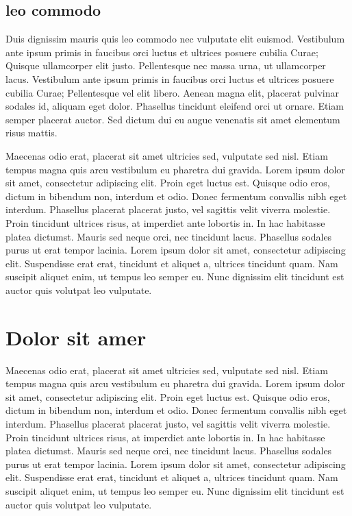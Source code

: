 \documentclass[twoside,emptyfirstpagenumber,swedish]{../thesis}
\begin{document}
\subsection{leo commodo}

Duis dignissim mauris quis leo commodo nec vulputate elit euismod. Vestibulum ante ipsum primis in faucibus orci luctus et ultrices posuere cubilia Curae; Quisque ullamcorper elit justo. Pellentesque nec massa urna, ut ullamcorper lacus. Vestibulum ante ipsum primis in faucibus orci luctus et ultrices posuere cubilia Curae; Pellentesque vel elit libero. Aenean magna elit, placerat pulvinar sodales id, aliquam eget dolor. Phasellus tincidunt eleifend orci ut ornare. Etiam semper placerat auctor. Sed dictum dui eu augue venenatis sit amet elementum risus mattis.

Maecenas odio erat, placerat sit amet ultricies sed, vulputate sed nisl. Etiam tempus magna quis arcu vestibulum eu pharetra dui gravida. Lorem ipsum dolor sit amet, consectetur adipiscing elit. Proin eget luctus est. Quisque odio eros, dictum in bibendum non, interdum et odio. Donec fermentum convallis nibh eget interdum. Phasellus placerat placerat justo, vel sagittis velit viverra molestie. Proin tincidunt ultrices risus, at imperdiet ante lobortis in. In hac habitasse platea dictumst. Mauris sed neque orci, nec tincidunt lacus. Phasellus sodales purus ut erat tempor lacinia. Lorem ipsum dolor sit amet, consectetur adipiscing elit. Suspendisse erat erat, tincidunt et aliquet a, ultrices tincidunt quam. Nam suscipit aliquet enim, ut tempus leo semper eu. Nunc dignissim elit tincidunt est auctor quis volutpat leo vulputate.

\section{Dolor sit amer}

\cite{website:zoompfcdns} Maecenas odio erat, placerat sit amet \cite{test}ultricies sed, vulputate sed nisl. Etiam tempus magna quis arcu vestibulum eu pharetra dui gravida. Lorem ipsum dolor sit amet, consectetur adipiscing elit. Proin eget luctus est. Quisque odio eros, dictum in bibendum non, interdum et odio. Donec fermentum convallis nibh eget interdum. Phasellus placerat placerat justo, vel sagittis velit viverra molestie. Proin tincidunt ultrices risus, at imperdiet ante lobortis in. In hac habitasse platea dictumst. Mauris sed neque orci, nec tincidunt lacus. Phasellus sodales purus ut erat tempor lacinia. Lorem ipsum dolor sit amet, consectetur adipiscing elit. Suspendisse erat erat, tincidunt et aliquet a, ultrices tincidunt quam. Nam suscipit aliquet enim, ut tempus leo semper eu. Nunc dignissim elit tincidunt est auctor quis volutpat leo vulputate.
\end{document}
